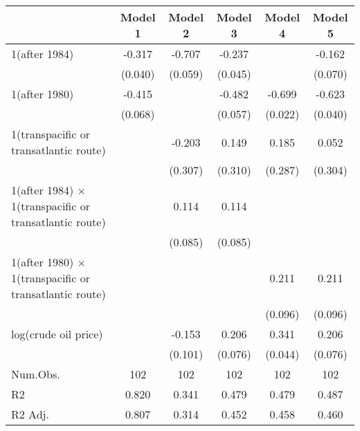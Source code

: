 
\begin{tabular}[t]{lccccc}
\toprule
  & Model 1 & Model 2 & Model 3 & Model 4 & Model 5\\
\midrule
1(after 1984) & -0.317 & -0.707 & -0.237 &  & -0.162\\
 & (0.040) & (0.059) & (0.045) &  & (0.070)\\
1(after 1980) & -0.415 &  & -0.482 & -0.699 & -0.623\\
 & (0.068) &  & (0.057) & (0.022) & (0.040)\\
1(transpacific or transatlantic route) &  & -0.203 & 0.149 & 0.185 & 0.052\\
 &  & (0.307) & (0.310) & (0.287) & (0.304)\\
1(after 1984) × 1(transpacific or transatlantic route) &  & 0.114 & 0.114 &  & \\
 &  & (0.085) & (0.085) &  & \\
1(after 1980) × 1(transpacific or transatlantic route) &  &  &  & 0.211 & 0.211\\
 &  &  &  & (0.096) & (0.096)\\
log(crude oil price) &  & -0.153 & 0.206 & 0.341 & 0.206\\
 &  & (0.101) & (0.076) & (0.044) & (0.076)\\
\midrule
Num.Obs. & 102 & 102 & 102 & 102 & 102\\
R2 & 0.820 & 0.341 & 0.479 & 0.479 & 0.487\\
R2 Adj. & 0.807 & 0.314 & 0.452 & 0.458 & 0.460\\
\bottomrule
\end{tabular}
